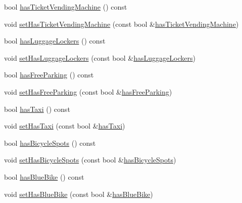\begin{DoxyCompactItemize}
\item 
bool \mbox{\hyperlink{classQRail_1_1StationEngine_1_1Station_a686c92468373024b437f0589192668aa}{has\+Ticket\+Vending\+Machine}} () const
\item 
void \mbox{\hyperlink{classQRail_1_1StationEngine_1_1Station_a9791d7b50eed4fad65f2fe5a2ca87876}{set\+Has\+Ticket\+Vending\+Machine}} (const bool \&\mbox{\hyperlink{classQRail_1_1StationEngine_1_1Station_a686c92468373024b437f0589192668aa}{has\+Ticket\+Vending\+Machine}})
\item 
bool \mbox{\hyperlink{classQRail_1_1StationEngine_1_1Station_a09182a137537232a38bc44f00e274355}{has\+Luggage\+Lockers}} () const
\item 
void \mbox{\hyperlink{classQRail_1_1StationEngine_1_1Station_a55fe035b25a59286aa257113c70b6d01}{set\+Has\+Luggage\+Lockers}} (const bool \&\mbox{\hyperlink{classQRail_1_1StationEngine_1_1Station_a09182a137537232a38bc44f00e274355}{has\+Luggage\+Lockers}})
\item 
bool \mbox{\hyperlink{classQRail_1_1StationEngine_1_1Station_adacc2051c657557f3494168e12cd9809}{has\+Free\+Parking}} () const
\item 
void \mbox{\hyperlink{classQRail_1_1StationEngine_1_1Station_a19b10db4449466770ca0a210ef0b400a}{set\+Has\+Free\+Parking}} (const bool \&\mbox{\hyperlink{classQRail_1_1StationEngine_1_1Station_adacc2051c657557f3494168e12cd9809}{has\+Free\+Parking}})
\item 
bool \mbox{\hyperlink{classQRail_1_1StationEngine_1_1Station_a898d71b83cb5deca0f024cbef343c373}{has\+Taxi}} () const
\item 
void \mbox{\hyperlink{classQRail_1_1StationEngine_1_1Station_a50c9fcc45a2f96e58e1058ab6b723dc0}{set\+Has\+Taxi}} (const bool \&\mbox{\hyperlink{classQRail_1_1StationEngine_1_1Station_a898d71b83cb5deca0f024cbef343c373}{has\+Taxi}})
\item 
bool \mbox{\hyperlink{classQRail_1_1StationEngine_1_1Station_adce0ee13730ec3e93866854af6e9048a}{has\+Bicycle\+Spots}} () const
\item 
void \mbox{\hyperlink{classQRail_1_1StationEngine_1_1Station_ac6859b73232d1d6d185fdfe5a6426da7}{set\+Has\+Bicycle\+Spots}} (const bool \&\mbox{\hyperlink{classQRail_1_1StationEngine_1_1Station_adce0ee13730ec3e93866854af6e9048a}{has\+Bicycle\+Spots}})
\item 
bool \mbox{\hyperlink{classQRail_1_1StationEngine_1_1Station_a9c710a576b7834006ab714a3f298c6e6}{has\+Blue\+Bike}} () const
\item 
void \mbox{\hyperlink{classQRail_1_1StationEngine_1_1Station_a9a0738e9df95033eef7b88a1abb1e1cb}{set\+Has\+Blue\+Bike}} (const bool \&\mbox{\hyperlink{classQRail_1_1StationEngine_1_1Station_a9c710a576b7834006ab714a3f298c6e6}{has\+Blue\+Bike}})

\end{DoxyCompactItemize}
